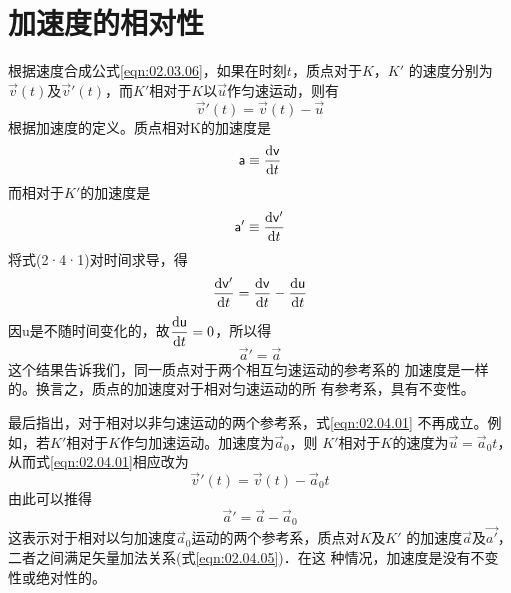 \section{加速度的相对性}\label{sec:02.04}
    根据速度合成公式\eqref{eqn:02.03.06}，如果在时刻$t$，质点对于$K$，$K'$
的速度分别为$\vec{v}(t)$及$\vec{v}'(t)$，而$K'$相对于$K$以$\vec{u}$作匀速运动，则有
\begin{equation}\label{eqn:02.04.01}
    \vec{v}'(t)=\vec{v}(t)-\vec{u}
\end{equation}
根据加速度的定义。质点相对K的加速度是
\begin{equation}\label{eqn:02.04.02}
    {\mathsf{a}}\equiv\frac{{\rm d} {\mathsf{v}}}{{\rm d} t}
\end{equation}
而相对于$K'$的加速度是
\begin{equation}\label{eqn:02.04.03}
    {\mathsf{a}}'\equiv\frac{{\rm d} {\mathsf{v}}'}{{\rm d} t}
\end{equation}
将式(2·4·1)对时间求导，得
\begin{equation}
    \frac{{\rm d} {\mathsf{v}}'}{{\rm d} t}=\frac{{\rm d} {\mathsf{v}}}{{\rm d} t}-\frac{{\rm d} {\mathsf{u}}}{{\rm d} t}
\end{equation}
因u是不随时间变化的，故$\dfrac{{\rm d} {\mathsf{u}}}{{\rm d} t}=0$，所以得
\begin{equation}\label{eqn:02.04.04}
    \vec{a}'=\vec{a}
\end{equation}
这个结果告诉我们，同一质点对于两个相互匀速运动的参考系的
加速度是一样的。换言之，质点的加速度对于相对匀速运动的所
有参考系，具有不变性。

最后指出，对于相对以非匀速运动的两个参考系，式\eqref{eqn:02.04.01}
不再成立。例如，若$K'$相对于$K$作匀加速运动。加速度为$\vec{a}_0$，则
$K'$相对于$K$的速度为$\vec{u}=\vec{a}_0t$，从而式\eqref{eqn:02.04.01}相应改为
\begin{equation*}
    \vec{v}'(t)=\vec{v}(t)-\vec{a}_0t
\end{equation*}
由此可以推得
\begin{equation}\label{eqn:02.04.05}
    \vec{a}'=\vec{a} - \vec{a}_0
\end{equation}
这表示对于相对以匀加速度$\vec{a}_0$运动的两个参考系，质点对$K$及$K'$
的加速度$\vec{a}$及$\vec{a'}$，二者之间满足矢量加法关系(式\eqref{eqn:02.04.05})．在这
种情况，加速度是没有不变性或绝对性的。
